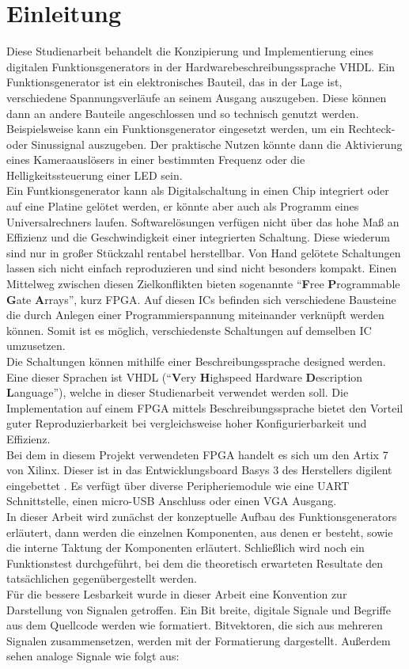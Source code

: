 \chapter[Einleitung]{Einleitung}

Diese Studienarbeit behandelt die Konzipierung und Implementierung eines digitalen Funktionsgenerators in der Hardwarebeschreibungssprache VHDL.
Ein Funktionsgenerator ist ein elektronisches Bauteil, das in der Lage ist, verschiedene Spannungsverläufe an seinem Ausgang auszugeben.
Diese können dann an andere Bauteile angeschlossen und so technisch genutzt werden.
Beispielsweise kann ein Funktionsgenerator eingesetzt werden, um ein Rechteck- oder Sinussignal auszugeben.
Der praktische Nutzen könnte dann die Aktivierung eines Kameraauslösers in einer bestimmten Frequenz oder die Helligkeitssteuerung einer LED sein. \\
Ein Funtkionsgenerator kann als Digitalschaltung in einen Chip integriert oder auf eine Platine gelötet werden, er könnte aber auch als Programm eines Universalrechners laufen.
Softwarelösungen verfügen nicht über das hohe Maß an Effizienz und die Geschwindigkeit einer integrierten Schaltung.
Diese wiederum sind nur in großer Stückzahl rentabel herstellbar.
Von Hand gelötete Schaltungen lassen sich nicht einfach reproduzieren und sind nicht besonders kompakt.
Einen Mittelweg zwischen diesen Zielkonflikten bieten sogenannte ``\textbf{F}ree \textbf{P}rogrammable \textbf{G}ate \textbf{A}rrays'', kurz FPGA.
Auf diesen ICs befinden sich verschiedene Bausteine die durch Anlegen einer Programmierspannung miteinander verknüpft werden können.
Somit ist es möglich, verschiedenste Schaltungen auf demselben IC umzusetzen. \\
Die Schaltungen können mithilfe einer Beschreibungssprache designed werden.
Eine dieser Sprachen ist VHDL (``\textbf{V}ery \textbf{H}ighspeed Hardware \textbf{D}escription \textbf{L}anguage''), welche in dieser Studienarbeit verwendet werden soll.
Die Implementation auf einem FPGA mittels Beschreibungssprache bietet den Vorteil guter Reproduzierbarkeit bei vergleichsweise hoher Konfigurierbarkeit und Effizienz. \\
Bei dem in diesem Projekt verwendeten FPGA handelt es sich um den Artix 7 von Xilinx.
Dieser ist in das Entwicklungsboard Basys 3 des Herstellers digilent eingebettet \cite{digilent2016}.
Es verfügt über diverse Peripheriemodule wie eine UART Schnittstelle, einen micro-USB Anschluss oder einen VGA Ausgang. \\
In dieser Arbeit wird zunächst der konzeptuelle Aufbau des Funktionsgenerators erläutert, dann werden die einzelnen Komponenten, aus denen er besteht, sowie die interne Taktung der Komponenten erläutert.
Schließlich wird noch ein Funktionstest durchgeführt, bei dem die theoretisch erwarteten Resultate den tatsächlichen gegenübergestellt werden. \\
Für die bessere Lesbarkeit wurde in dieser Arbeit eine Konvention zur Darstellung von Signalen getroffen.
Ein Bit breite, digitale Signale und Begriffe aus dem Quellcode werden wie  formatiert.
Bitvektoren, die sich aus mehreren Signalen zusammensetzen, werden mit der Formatierung  dargestellt.
Außerdem sehen analoge Signale wie folgt aus:  